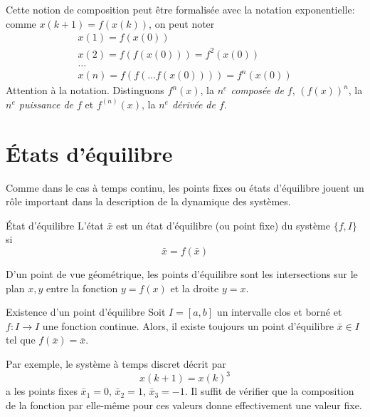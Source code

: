         Cette notion de composition peut être formalisée avec la notation exponentielle: comme $x(k+1) = f(x(k))$, on peut noter 
        \begin{equation}
            \begin{split}
                x(1) = f(x(0)) \\
                x(2) = f(f(x(0))) = f^2(x(0)) \\
                \dots\\
                x(n) = f(f(\dots f(x(0)))) = f^n(x(0))
            \end{split}
        \end{equation}
        Attention à la notation. Distinguons $f^n(x)$, la \textit{$n^e$ composée de $f$}, $(f(x))^n$, la \textit{$n^e$ puissance de $f$} et $f^{(n)}(x)$, la \textit{$n^e$ dérivée de $f$}. 

    \section{États d'équilibre}
        Comme dans le cas à temps continu, les points fixes ou états d'équilibre jouent un rôle important dans la description de la dynamique des systèmes.

        \begin{definition}{État d'équilibre}
            L’état $\bar{x}$ est un état d’équilibre (ou point fixe) du système $\{f, I\}$  si
            \begin{equation}
                \bar{x} = f(\bar{x})
            \end{equation}
        \end{definition}
        D'un point de vue géométrique, les points d’équilibre sont les intersections sur le plan $x, y$ entre la fonction $y = f(x)$ et la droite $y = x$.
        \begin{theorem}{Existence d'un point d'équilibre}
            Soit $I = [a, b]$ un intervalle clos et borné et $f : I \to I$ une fonction continue. Alors, il existe toujours un point d’équilibre $\bar{x} \in I$ tel que $f(\bar{x}) = \bar{x}$.
        \end{theorem}

        Par exemple, le système à temps discret décrit par
        \begin{equation}
            x(k + 1) = x(k)^3
        \end{equation}
        a les points fixes $\bar{x}_1 = 0$, $\bar{x}_2 = 1$, $\bar{x}_3 = -1$. Il suffit de vérifier que la composition de la fonction par elle-même pour ces valeurs donne effectivement une valeur fixe.

